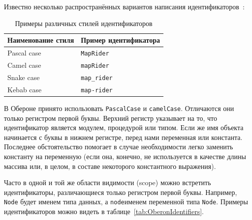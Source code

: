 \documentclass[utf8]{lgu}
\newcommand{\tire}{\unskip\nobreak\thinspace\textemdash\thinspace}
\newcommand{\code}[1]{{\normalsize\texttt{#1}}}
\begin{document}
Известно несколько распространённых вариантов написания идентификаторов~\cite{NamingOfMethods}:

\begin{table}[H]
\centering
\caption{Примеры различных стилей идентификаторов}
\label{tab:NamingStyles}
\vspace{8pt}
\small
\begin{tabular}{@{} l l @{}}
\toprule
  Наименование стиля & Пример идентификатора \\
\midrule
  Pascal case & \code{MapRider} \\
  Camel case & \code{mapRider} \\
  Snake case & \code{map\_rider} \\
  Kebab case & \code{map-rider} \\
\bottomrule
\end{tabular}
\end{table}

В Обероне принято использовать \code{PascalCase} и \code{camelCase}. Отличаются они только регистром первой буквы. Верхний регистр указывает на то, что идентификатор является модулем, процедурой или типом. Если же имя объекта начинается с буквы в нижнем регистре, перед нами переменная или константа. Последнее обстоятельство помогает в случае необходимости легко заменить константу на переменную (если она, конечно, не используется в качестве длины массива или, в целом, в составе некоторого константного выражения).

Часто в одной и той же области видимости (scope) можно встретить идентификаторы, различающиеся только регистром первой буквы. Например, \code{Node} будет именем типа данных, а \code{node}\tire именем переменной типа \code{Node}. Примеры идентификаторов можно видеть в таблице~\ref{tab:OberonIdentifiers}.
\end{document}
